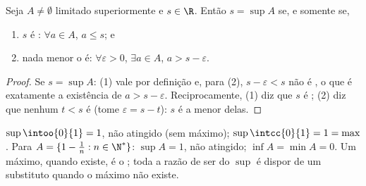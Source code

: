 \begin{proposition}\label{prop:b1:reals:epsilon}
Seja $A \neq \emptyset$ limitado superiormente e $s \in \R$. Então $s =
\sup A$ se, e somente se,
\begin{enumerate}
  \item $s$ é : $\forall a \in A$, $a \leq s$; e
  \item nada menor o é: $\forall \varepsilon > 0$, $\exists a \in
        A$, $a > s - \varepsilon$.
\end{enumerate}
\end{proposition}

\begin{proof}
Se $s = \sup A$: (1) vale por definição e, para (2), $s -
\varepsilon < s$ não é , o que é exatamente a
existência de $a > s - \varepsilon$. Reciprocamente, (1) diz que $s$ é
; (2) diz que nenhum $t < s$ é  (tome $\varepsilon
= s - t$): $s$ é a menor delas.
\end{proof}

\begin{example}\label{ex:b1:reals:supexamples}
$\sup \intoo{0}{1} = 1$, não atingido (sem máximo);
$\sup \intcc{0}{1} = 1 = \max$. Para $A = \{1 - \frac 1n : n \in
\N^*\}$: $\sup A = 1$, não atingido; $\inf A = \min A = 0$. Um máximo,
quando existe, é o ; toda a razão de ser do $\sup$ é dispor de
um substituto quando o máximo não existe.
\end{example}


